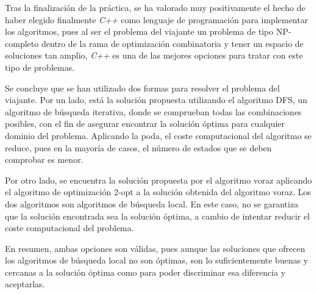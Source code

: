 \documentclass{uc3mpracticas}
\begin{document}
  Tras la finalización de la práctica, se ha valorado muy positivamente el hecho de haber elegido finalmente \textit{C++} como lenguaje de programación para implementar los algoritmos, pues al ser el problema del viajante un problema de tipo NP-completo dentro de la rama de optimización combinatoria y tener un espacio de soluciones tan amplio, \textit{C++} es una de las mejores opciones para tratar con este tipo de problemas.

  \vspace{2mm}

  Se concluye que se han utilizado dos formas para resolver el problema del viajante. Por un lado, está la solución propuesta utilizando el algoritmo DFS, un algoritmo de búsqueda iterativa, donde se comprueban todas las combinaciones posibles, con el fin de asegurar encontrar la solución óptima para cualquier dominio del problema. Aplicando la poda, el coste computacional del algoritmo se reduce, pues en la mayoría de casos, el número de estados que se deben comprobar es menor.

  \vspace{2mm}

  Por otro lado, se encuentra la solución propuesta por el algoritmo voraz aplicando el algoritmo de optimización 2-opt a la solución obtenida del algoritmo voraz. Los dos algoritmos son algoritmos de búsqueda local. En este caso, no se garantiza que la solución encontrada sea la solución óptima, a cambio de intentar reducir el coste computacional del problema.

  \vspace{2mm}

  En resumen, ambas opciones son válidas, pues aunque las soluciones que ofrecen los algoritmos de búsqueda local no son óptimas, son lo suficientemente buenas y cercanas a la solución óptima como para poder discriminar esa diferencia y aceptarlas.



  \newpage

  
  
\end{document}
